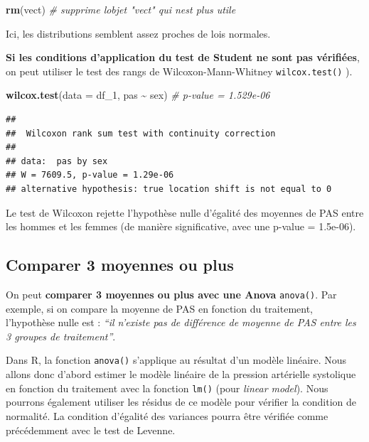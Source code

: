 \documentclass[
]{book}
\newenvironment{Shaded}{\begin{snugshade}}{\end{snugshade}}
\newcommand{\AttributeTok}[1]{\textcolor[rgb]{0.13,0.29,0.53}{#1}}
\newcommand{\CommentTok}[1]{\textcolor[rgb]{0.56,0.35,0.01}{\textit{#1}}}
\newcommand{\FunctionTok}[1]{\textcolor[rgb]{0.13,0.29,0.53}{\textbf{#1}}}
\newcommand{\NormalTok}[1]{#1}
\newcommand{\SpecialCharTok}[1]{\textcolor[rgb]{0.81,0.36,0.00}{\textbf{#1}}}
\begin{document}
\begin{Shaded}
\begin{Highlighting}[]
\FunctionTok{rm}\NormalTok{(vect) }\CommentTok{\# supprime l\textquotesingle{}objet "vect" qui n\textquotesingle{}est plus utile}
\end{Highlighting}
\end{Shaded}

Ici, les distributions semblent assez proches de lois normales.

\textbf{Si les conditions d'application du test de Student ne sont pas vérifiées}, on peut utiliser le test des rangs de Wilcoxon-Mann-Whitney \texttt{wilcox.test()} ).

\begin{Shaded}
\begin{Highlighting}[]
\FunctionTok{wilcox.test}\NormalTok{(}\AttributeTok{data =}\NormalTok{ df\_1, pas }\SpecialCharTok{\textasciitilde{}}\NormalTok{ sex) }\CommentTok{\# p{-}value = 1.529e{-}06}
\end{Highlighting}
\end{Shaded}

\begin{verbatim}
## 
##  Wilcoxon rank sum test with continuity correction
## 
## data:  pas by sex
## W = 7609.5, p-value = 1.29e-06
## alternative hypothesis: true location shift is not equal to 0
\end{verbatim}

Le test de Wilcoxon rejette l'hypothèse nulle d'égalité des moyennes de PAS entre les hommes et les femmes (de manière significative, avec une p-value = 1.5e-06).

\subsection{Comparer 3 moyennes ou plus}\label{comparer-3-moyennes-ou-plus}

On peut \textbf{comparer 3 moyennes ou plus avec une Anova} \texttt{anova()}. Par exemple, si on compare la moyenne de PAS en fonction du traitement, l'hypothèse nulle est : \emph{``il n'existe pas de différence de moyenne de PAS entre les 3 groupes de traitement''}.

Dans R, la fonction \texttt{anova()} s'applique au résultat d'un modèle linéaire. Nous allons donc d'abord estimer le modèle linéaire de la pression artérielle systolique en fonction du traitement avec la fonction \texttt{lm()} (pour \emph{linear model}). Nous pourrons également utiliser les résidus de ce modèle pour vérifier la condition de normalité. La condition d'égalité des variances pourra être vérifiée comme précédemment avec le test de Levenne.
\end{document}

